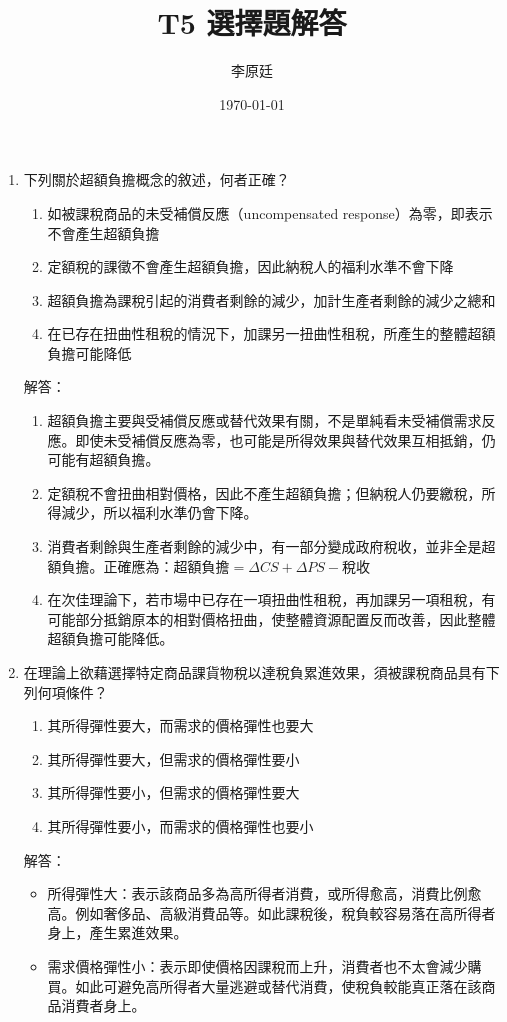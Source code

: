 \documentclass[12pt, a4paper]{article}
\begin{document}
\title{T5 選擇題解答} %
\author{李原廷} %
\date{\today} %

\maketitle



\begin{enumerate}

    \item 下列關於超額負擔概念的敘述，何者正確？
    \begin{enumerate}[label=\Alph*.]
        \item 如被課稅商品的未受補償反應（uncompensated response）為零，即表示不會產生超額負擔
        \item 定額稅的課徵不會產生超額負擔，因此納稅人的福利水準不會下降
        \item 超額負擔為課稅引起的消費者剩餘的減少，加計生產者剩餘的減少之總和
        \item 在已存在扭曲性租稅的情況下，加課另一扭曲性租稅，所產生的整體超額負擔可能降低
    \end{enumerate}
    解答：
    \begin{enumerate}[label=\Alph*.]
        \item 超額負擔主要與受補償反應或替代效果有關，不是單純看未受補償需求反應。即使未受補償反應為零，也可能是所得效果與替代效果互相抵銷，仍可能有超額負擔。
        \item 定額稅不會扭曲相對價格，因此不產生超額負擔；但納稅人仍要繳稅，所得減少，所以福利水準仍會下降。
        \item 消費者剩餘與生產者剩餘的減少中，有一部分變成政府稅收，並非全是超額負擔。正確應為：$\text{超額負擔} = \Delta CS + \Delta PS - \text{稅收}$
        \item 在次佳理論下，若市場中已存在一項扭曲性租稅，再加課另一項租稅，有可能部分抵銷原本的相對價格扭曲，使整體資源配置反而改善，因此整體超額負擔可能降低。
    \end{enumerate}

    \item 在理論上欲藉選擇特定商品課貨物稅以達稅負累進效果，須被課稅商品具有下列何項條件？
    \begin{enumerate}[label=\Alph*.]
        \item 其所得彈性要大，而需求的價格彈性也要大
        \item 其所得彈性要大，但需求的價格彈性要小
        \item 其所得彈性要小，但需求的價格彈性要大
        \item 其所得彈性要小，而需求的價格彈性也要小
    \end{enumerate}
    解答：
    \begin{itemize}
        \item 所得彈性大：表示該商品多為高所得者消費，或所得愈高，消費比例愈高。例如奢侈品、高級消費品等。如此課稅後，稅負較容易落在高所得者身上，產生累進效果。
        \item 需求價格彈性小：表示即使價格因課稅而上升，消費者也不太會減少購買。如此可避免高所得者大量逃避或替代消費，使稅負較能真正落在該商品消費者身上。
    \end{itemize}



\end{enumerate}
\end{document}

